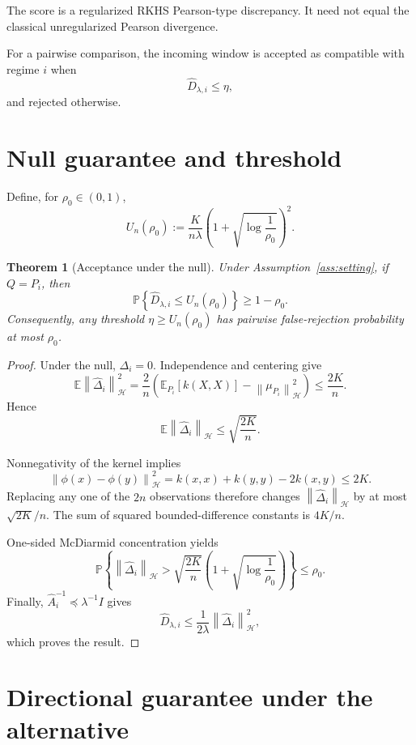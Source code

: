 \documentclass[11pt]{article}
\newcommand{\HH}{\mathcal H}
\newcommand{\E}{\mathbb E}
\newcommand{\Prob}{\mathbb P}
\newcommand{\norm}[1]{\left\lVert #1\right\rVert_{\HH}}
\newtheorem{theorem}{Theorem}
\begin{document}
The score is a regularized RKHS Pearson-type discrepancy.
It need not equal the classical unregularized Pearson
divergence.

For a pairwise comparison, the incoming window is accepted
as compatible with regime $i$ when
\[
    \widehat D_{\lambda,i}\le\eta,
\]
and rejected otherwise.

\section{Null guarantee and threshold}

Define, for $\rho_0\in(0,1)$,
\begin{equation}
    U_n(\rho_0)
    :=
    \frac{K}{n\lambda}
    \left(1+\sqrt{\log\frac1{\rho_0}}\right)^2.
    \label{eq:null-threshold}
\end{equation}

\begin{theorem}[Acceptance under the null]
\label{thm:null}
Under Assumption~\ref{ass:setting}, if $Q=P_i$, then
\[
    \Prob\left\{
        \widehat D_{\lambda,i}\le U_n(\rho_0)
    \right\}\ge 1-\rho_0.
\]
Consequently, any threshold $\eta\ge U_n(\rho_0)$
has pairwise false-rejection probability at most $\rho_0$.
\end{theorem}

\begin{proof}
Under the null, $\Delta_i=0$. Independence and centering give
\[
    \E\norm{\widehat\Delta_i}^2
    =
    \frac2n
    \left(
        \E_{P_i}[k(X,X)]-\norm{\mu_{P_i}}^2
    \right)
    \le\frac{2K}{n}.
\]
Hence
\[
    \E\norm{\widehat\Delta_i}
    \le\sqrt{\frac{2K}{n}}.
\]

Nonnegativity of the kernel implies
\[
    \norm{\phi(x)-\phi(y)}^2
    =
    k(x,x)+k(y,y)-2k(x,y)
    \le 2K.
\]
Replacing any one of the $2n$ observations therefore
changes $\norm{\widehat\Delta_i}$ by at most
$\sqrt{2K}/n$. The sum of squared bounded-difference
constants is $4K/n$.

One-sided McDiarmid concentration yields
\[
    \Prob\left\{
        \norm{\widehat\Delta_i}
        >
        \sqrt{\frac{2K}{n}}
        \left(1+\sqrt{\log\frac1{\rho_0}}\right)
    \right\}
    \le\rho_0.
\]
Finally, $\widehat A_i^{-1}\preceq\lambda^{-1}I$ gives
\[
    \widehat D_{\lambda,i}
    \le\frac1{2\lambda}\norm{\widehat\Delta_i}^2,
\]
which proves the result.
\end{proof}

\section{Directional guarantee under the alternative}
\end{document}
